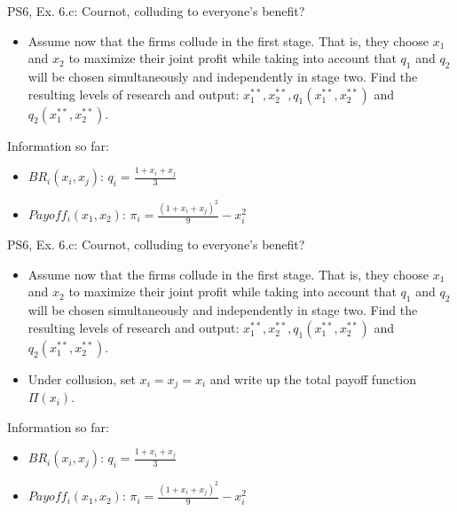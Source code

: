 \begin{frame}{PS6, Ex. 6.c: Cournot, colluding to everyone's benefit?}
    \begin{itemize}
    \item[(c)] Assume now that the firms collude in the first stage. That is, they choose $x_1$ and $x_2$ to maximize their joint profit while taking into account that $q_1$ and $q_2$ will be chosen simultaneously and independently in stage two. Find the resulting levels of research and output: $x_1^{**},x_2^{**},q_1(x_1^{**},x_2^{**})$ and $q_2(x_1^{**},x_2^{**})$.
    \end{itemize}
  \begin{multicols}{2}
    \vfill\null \columnbreak
    Information so far:
    \begin{itemize}
      \item[1] $BR_i(x_i,x_j)$: $q_i = \frac{1+x_i+x_j}{3}$
      \item[2] $Payoff_i(x_1,x_2)$: $\pi_i=\frac{(1+x_i+x_j)^2}{9}-x_i^2$
    \end{itemize}
    \vfill\null
  \end{multicols}
\end{frame}
\begin{frame}{PS6, Ex. 6.c: Cournot, colluding to everyone's benefit?}
    \begin{itemize}
    \item[(c)] Assume now that the firms collude in the first stage. That is, they choose $x_1$ and $x_2$ to maximize their joint profit while taking into account that $q_1$ and $q_2$ will be chosen simultaneously and independently in stage two. Find the resulting levels of research and output: $x_1^{**},x_2^{**},q_1(x_1^{**},x_2^{**})$ and $q_2(x_1^{**},x_2^{**})$.
    \end{itemize}
  \begin{multicols}{2}
    \begin{itemize}
      \item[(Step 1)] Under collusion, set $x_i=x_j=x_i$ and write up the total payoff function $\Pi(x_i)$.
    \end{itemize}
    \vfill\null \columnbreak
    Information so far:
    \begin{itemize}
      \item[1] $BR_i(x_i,x_j)$: $q_i = \frac{1+x_i+x_j}{3}$
      \item[2] $Payoff_i(x_1,x_2)$: $\pi_i=\frac{(1+x_i+x_j)^2}{9}-x_i^2$
    \end{itemize}
    \vfill\null
  \end{multicols}
\end{frame}
